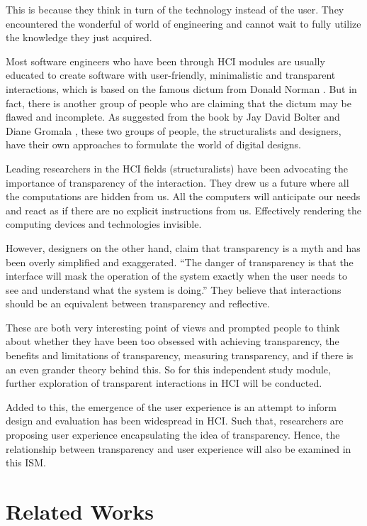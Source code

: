 \documentclass{acm_proc_article-sp}
\begin{document}
This is because they think in turn of the technology instead of the
user. They encountered the wonderful of world of engineering and
cannot wait to fully utilize the knowledge they just acquired.




Most software engineers who have been through HCI modules are usually
educated to create software with user-friendly, minimalistic and
transparent interactions, which is based on the famous dictum from
Donald Norman \cite{design:norman}. But in fact, there is another
group of people who are claiming that the dictum may be flawed and
incomplete. As suggested from the book by Jay David Bolter and Diane
Gromala \cite{windows:bolter}, these two groups of people, the
structuralists and designers, have their own approaches to formulate
the world of digital designs.

Leading researchers in the HCI fields (structuralists) have been
advocating the importance of transparency of the interaction. They
drew us a future where all the computations are hidden from us. All
the computers will anticipate our needs and react as if there are no
explicit instructions from us. Effectively rendering the computing
devices and technologies invisible.

However, designers on the other hand, claim that transparency is a
myth and has been overly simplified and exaggerated. “The danger of
transparency is that the interface will mask the operation of the
system exactly when the user needs to see and understand what the
system is doing.” They believe that interactions should be an
equivalent between transparency and reflective.

These are both very interesting point of views and prompted people to
think about whether they have been too obsessed with achieving
transparency, the benefits and limitations of transparency, measuring
transparency, and if there is an even grander theory behind this. So
for this independent study module, further exploration of transparent
interactions in HCI will be conducted.

Added to this, the emergence of the user experience is an attempt to
inform design and evaluation has been widespread in HCI. Such that,
researchers are proposing user experience encapsulating the idea of
transparency. Hence, the relationship between transparency and user
experience will also be examined in this ISM.

\section{Related Works}



\end{document}
